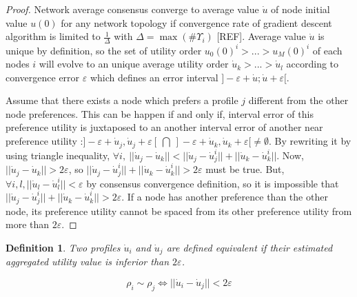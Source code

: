 \documentclass[10pt,twocolumn]{article}
\newtheorem{definition}{Definition}
\begin{document}
\begin{proof}
Network average consensus converge to average value $\dot{u}$ of node initial value $u(0)$ for any network topology if convergence rate of gradient descent algorithm is limited to $\frac{1}{\Delta}$ with $\Delta = \max(\#\Upsilon_i)$ [REF]. Average value $\dot{u}$ is unique by definition, so the set of utility order $u_0(0)^i > ... > u_M(0)^i$ of each nodes $i$ will evolve to an unique average utility order $\dot{u}_k > ... > \dot{u}_l$ according to convergence error $\varepsilon$ which defines an error interval $]- \varepsilon + \dot{u} ; \dot{u} + \varepsilon [$. 

Assume that there exists a node which prefers a profile $j$ different from the other node preferences. This can be happen if and only if, interval error of this preference utility is juxtaposed to an another interval error of another near preference utility :$]-\varepsilon + \dot{u}_j, \dot{u}_j + \varepsilon [ \ \bigcap \ ]-\varepsilon + \dot{u}_k, \dot{u}_k + \varepsilon [ \not = \emptyset $. By rewriting it by using triangle inequality, $ \forall i, \  ||\dot{u}_j - \dot{u}_k|| < ||\dot{u}_j - \dot{u}_j^i || + ||\dot{u}_k - \dot{u}_k^i||$. Now, $|| \dot{u}_j - \dot{u}_k|| > 2 \varepsilon$, so $||\dot{u}_j - \dot{u}_j^i || + ||\dot{u}_k - \dot{u}_k^i|| > 2 \varepsilon$ must be true. But, $\forall i,l, ||\dot{u}_l - \dot{u}_l^i|| < \varepsilon$ by consensus convergence definition, so it is impossible that $||\dot{u}_j - \dot{u}_j^i || + ||\dot{u}_k - \dot{u}_k^i|| > 2 \varepsilon$. If a node has another preference than the other node, its preference utility cannot be spaced from its other preference utility from more than $2 \varepsilon$.


\end{proof}

\begin{definition}
\label{def-equivalent}
Two profiles $\dot{u}_i$ and $\dot{u}_j$ are defined equivalent if their estimated aggregated utility value is inferior than $2 \varepsilon$.
\end{definition}
\begin{equation}
\label{eq-decision-equivalent}
\rho_i \sim \rho_j  \Longleftrightarrow ||\dot{u}_i - \dot{u}_j|| < 2 \varepsilon 
\end{equation}
\end{document}
